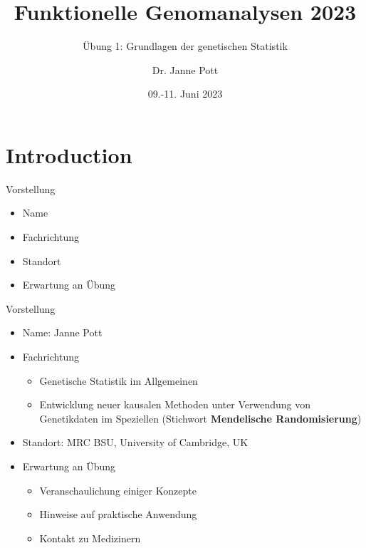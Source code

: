 \documentclass{beamer}
\title{Funktionelle Genomanalysen 2023}
\subtitle{Übung 1: Grundlagen der genetischen Statistik}
\author{Dr. Janne Pott}
\date{09.-11. Juni 2023}
\begin{document}
\begin{frame}
\titlepage
\end{frame}

\section{Introduction}

\begin{frame}{Vorstellung}
\begin{itemize}
    \item Name
    \item Fachrichtung 
    \item Standort
    \item Erwartung an Übung
\end{itemize}
\end{frame}

\begin{frame}{Vorstellung}
\begin{itemize}
    \item Name: Janne Pott
    \item Fachrichtung 
    \begin{itemize}
        \item Genetische Statistik im Allgemeinen
        \item Entwicklung neuer kausalen Methoden unter Verwendung von Genetikdaten im Speziellen (Stichwort \textbf{Mendelische Randomisierung})
    \end{itemize}
    \item Standort: MRC BSU, University of Cambridge, UK 
    \item Erwartung an Übung
    \begin{itemize}
        \item Veranschaulichung einiger Konzepte
        \item Hinweise auf praktische Anwendung 
        \item Kontakt zu Medizinern
    \end{itemize}
\end{itemize}    
\end{frame}
\end{document}
